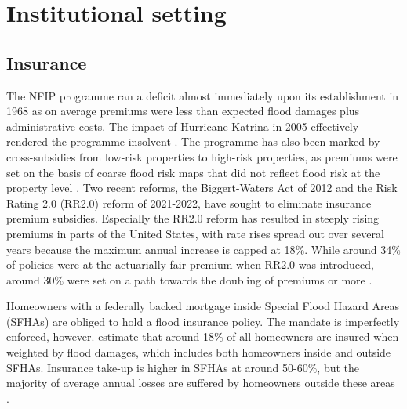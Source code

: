 \documentclass[12pt]{article}
\begin{document}


\section{Institutional setting}
\label{sec:institutional}

\subsection{Insurance}\label{subsec:insurance}
The NFIP programme ran a deficit almost immediately upon its establishment in 1968 as on average premiums were less than expected flood damages plus administrative costs. The impact of Hurricane Katrina in 2005 effectively rendered the programme insolvent \citep{michel2010catastrophe}. The programme has also been marked by cross-subsidies from low-risk properties to high-risk properties, as premiums were set on the basis of coarse flood risk maps that did not reflect flood risk at the property level \citep{kousky2018financing}. Two recent reforms, the Biggert-Waters Act of 2012 and the Risk Rating 2.0 (RR2.0) reform of 2021-2022, have sought to eliminate insurance premium subsidies. Especially the RR2.0 reform has resulted in steeply rising premiums in parts of the United States, with rate rises spread out over several years because the maximum annual increase is capped at 18$\%$. While around 34$\%$ of policies were at the actuarially fair premium when RR2.0 was introduced, around 30$\%$ were set on a path towards the doubling of premiums or more \citep[p.~25]{gao2023flood}.  

Homeowners with a federally backed mortgage inside Special Flood Hazard Areas (SFHAs) are obliged to hold a flood insurance policy. The mandate is imperfectly enforced, however. \cite{gruber2026optimal} estimate that around 18$\%$ of all homeowners are insured when weighted by flood damages, which includes both homeowners inside and outside SFHAs. Insurance take-up is higher in SFHAs at around 50-60$\%$, but the majority of average annual losses are suffered by homeowners outside these areas \citep{amornsiripanitch2025measuring}.
\end{document}
